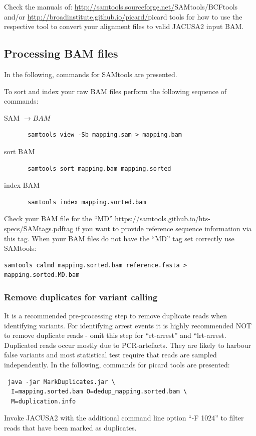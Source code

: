 \documentclass[10pt,a4paper]{article}
\begin{document}
Check the manuals of: \url{http://samtools.sourceforge.net/}{SAMtools/BCFtools} and/or
\url{http://broadinstitute.github.io/picard/}{picard tools} for how to use the
respective tool to convert your alignment files to valid JACUSA2 input BAM.
\subsection{Processing BAM files}
In the following, commands for SAMtools are presented.

To sort and index your raw BAM files perform the following sequence of commands:
\begin{description}
\item[SAM $\rightarrow BAM$] \begin{verbatim} samtools view -Sb mapping.sam > mapping.bam \end{verbatim}
\item[sort BAM] \begin{verbatim} samtools sort mapping.bam mapping.sorted \end{verbatim} 
\item[index BAM] \begin{verbatim} samtools index mapping.sorted.bam \end{verbatim}
\end{description}

Check your BAM file for the ``MD'' \url{https://samtools.github.io/hts-specs/SAMtags.pdf}{tag} 
if you want to provide reference sequence information via this tag. 
When your BAM files do not have the ``MD'' tag set correctly use SAMtools:
\begin{verbatim}
samtools calmd mapping.sorted.bam reference.fasta > mapping.sorted.MD.bam
\end{verbatim}
\subsubsection{Remove duplicates for variant calling}
It is a recommended pre-processing step to remove duplicate reads when identifying variants. For identifying
arrest events it is highly recommended NOT to remove duplicate reads - omit this step for ``rt-arrest'' and ``lrt-arrest.
Duplicated reads occur mostly due to PCR-artefacts. 
They are likely to harbour false variants and most statistical test require that reads are sampled independently.  
In the following, commands for picard tools are presented:
\begin{verbatim} java -jar MarkDuplicates.jar \ 
  I=mapping.sorted.bam O=dedup_mapping.sorted.bam \ 
  M=duplication.info
\end{verbatim}
Invoke JACUSA2 with the additional command line option ``-F 1024'' to filter reads that have been marked as duplicates.
\end{document}
